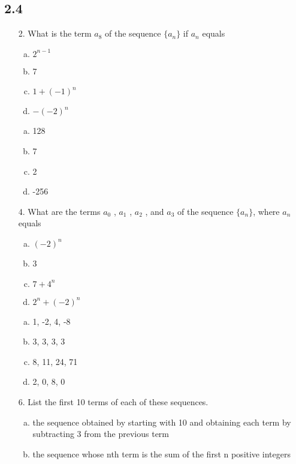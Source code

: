 \subsection{2.4}
\begin{itemize}
   \item[2.] What is the term $a_8$ of the sequence $\{a_n\}$ if $a_n$ equals
         \begin{enumerate}[a.]
            \item $2^{n-1}$
            \item 7
            \item $1 + (-1)^n$
            \item $-(-2)^n$
         \end{enumerate}
         \answer
         \begin{enumerate}[a.]
            \item 128
            \item 7
            \item 2
            \item -256
         \end{enumerate}
   \item[4.] What are the terms $a_0$ , $a_1$ , $a_2$ , and $a_3$ of the sequence $\{a_n\}$, where $a_n$ equals
         \begin{enumerate}[a.]
            \item $(-2)^n$
            \item 3
            \item $7 + 4^n$
            \item $2^n + (-2)^n$
         \end{enumerate}
         \answer
         \begin{enumerate}[a.]
            \item 1, -2, 4, -8
            \item 3, 3, 3, 3
            \item 8, 11, 24, 71
            \item 2, 0, 8, 0
         \end{enumerate}
   \item[6.] List the first 10 terms of each of these sequences.
         \begin{enumerate}[a.]
            \item the sequence obtained by starting with 10 and obtaining each term by subtracting 3 from the previous term
            \item the sequence whose nth term is the sum of the first n positive integers

\end{enumerate}
\end{itemize}

